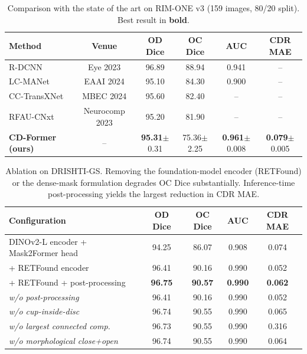 \begin{table}[t]
\centering
\caption{Comparison with the state of the art on RIM-ONE v3 (159 images, 80/20 split).
Best result in \textbf{bold}.}
\label{tab:rimone}
\setlength{\tabcolsep}{4pt}
\begin{tabular}{lccccc}
\toprule
\textbf{Method} & \textbf{Venue} & \textbf{OD Dice} & \textbf{OC Dice} & \textbf{AUC} & \textbf{CDR MAE} \\
\midrule
R-DCNN~\cite{li2023rdcnn}                & Eye 2023        & 96.89 & 88.94 & 0.941 & -- \\
LC-MANet~\cite{lcmanet2024}              & EAAI 2024       & 95.10 & 84.30 & 0.900 & -- \\
CC-TransXNet~\cite{cctransxnet2024}      & MBEC 2024       & 95.60 & 82.40 & --    & -- \\
RFAU-CNxt~\cite{rfaucnxt2023}            & Neurocomp 2023  & 95.20 & 81.90 & --    & -- \\
\midrule
\textbf{CD-Former (ours)} & --             & \textbf{95.31}$\pm$0.31 & 75.36$\pm$2.25 & \textbf{0.961}$\pm$0.008 & \textbf{0.079}$\pm$0.005 \\
\bottomrule
\end{tabular}
\end{table}


\begin{table}[t]
\centering
\caption{Ablation on DRISHTI-GS. Removing the foundation-model encoder
(RETFound) or the dense-mask formulation degrades OC Dice substantially.
Inference-time post-processing yields the largest reduction in CDR MAE.}
\label{tab:ablation}
\setlength{\tabcolsep}{6pt}
\begin{tabular}{lcccc}
\toprule
\textbf{Configuration} & \textbf{OD Dice} & \textbf{OC Dice} & \textbf{AUC} & \textbf{CDR MAE} \\
\midrule
DINOv2-L encoder + Mask2Former head    & 94.25 & 86.07 & 0.908 & 0.074 \\
\quad + RETFound encoder              & 96.41 & 90.16 & 0.990 & 0.052 \\
\quad + RETFound + post-processing    & \textbf{96.75} & \textbf{90.57} & \textbf{0.990} & \textbf{0.062} \\
\midrule
\textit{w/o post-processing}           & 96.41 & 90.16 & 0.990 & 0.052 \\
\textit{w/o cup-inside-disc}           & 96.74 & 90.55 & 0.990 & 0.065 \\
\textit{w/o largest connected comp.}   & 96.73 & 90.55 & 0.990 & 0.316 \\
\textit{w/o morphological close+open}  & 96.74 & 90.55 & 0.990 & 0.064 \\
\bottomrule
\end{tabular}
\end{table}


